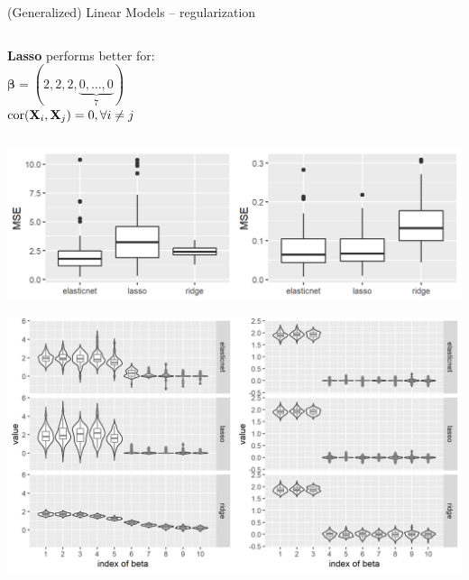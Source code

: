 \begin{frame}{(Generalized) Linear Models -- regularization}
\begin{columns}[T, totalwidth=\textwidth]
\begin{column}{0.38\textwidth}
\begin{columns}[T, totalwidth=\textwidth]
\begin{column}{0.5\textwidth}
\begin{center}
\textbf{Lasso} performs better for: \\
$\boldsymbol{\beta}=(2, 2, 2,\underbrace{0,\ldots,0}_{7})$ \\
$\operatorname{cor}(\mathbf{X}_{i},\mathbf{X}_{j})= 0, \forall i \neq j$
\end{center}
\end{column}
\end{columns}



          \includegraphics[width=\textwidth]{figure/enet_lasso_ridge_mse.png}
          
          \includegraphics[width=\textwidth]{figure/enet_tradeoff.png}
\end{column}

\end{columns}



\end{frame}


